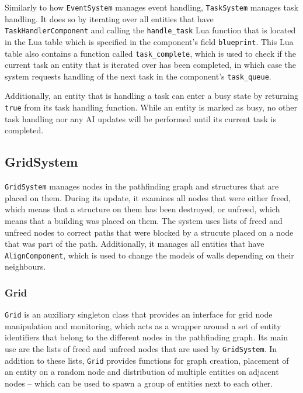 Similarly to how \texttt{EventSystem} manages event handling, \texttt{TaskSystem} manages task handling. It does so by iterating over
all entities that have \texttt{TaskHandlerComponent} and calling the \texttt{handle\_task} Lua function that is located in the Lua
table which is specified in the component's field \texttt{blueprint}. This Lua table also contains a function called \texttt{task\_complete},
which is used to check if the current task an entity that is iterated over has been completed, in which case the system requests
handling of the next task in the component's \texttt{task\_queue}.

Additionally, an entity that is handling a task can enter a busy state by returning \texttt{true} from its task handling function.
While an entity is marked as busy, no other task handling nor any AI updates will be performed until its current task is completed.

\subsection{GridSystem}

\texttt{GridSystem} manages nodes in the pathfinding graph and structures that are placed on them. During its update, it examines all
nodes that were either freed, which means that a structure on them has been destroyed, or unfreed, which means that a building was
placed on them. The system uses lists of freed and unfreed nodes to correct paths that were blocked by a strucute placed on a node
that was part of the path. Additionally, it manages all entities that have \texttt{AlignComponent}, which is used to change the models
of walls depending on their neighbours.

\subsubsection{Grid}

\texttt{Grid} is an auxiliary singleton class that provides an interface for grid node manipulation and monitoring, which acts as a
wrapper around a set of entity identifiers that belong to the different nodes in the pathfinding graph. Its main use are the lists
of freed and unfreed nodes that are used by \texttt{GridSystem}. In addition to these lists, \texttt{Grid} provides functions for graph
creation, placement of an entity on a random node and distribution of multiple entities on adjacent nodes -- which can be used to spawn
a group of entities next to each other.

